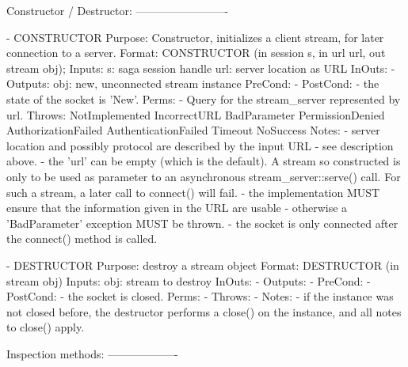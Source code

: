  \begin{myspec}
    Constructor / Destructor:
    -------------------------
 
    - CONSTRUCTOR
      Purpose:  Constructor, initializes a client stream,
                for later connection to a server.
      Format:   CONSTRUCTOR          (in  session    s,
                                      in  url        url,
                                      out stream  obj);
      Inputs:   s:                    saga session handle
                url:                  server location as URL
      InOuts:   -
      Outputs:  obj:                  new, unconnected stream
                                      instance
      PreCond:  -
      PostCond: - the state of the socket is 'New'.
      Perms:    - Query for the stream_server represented by
                  url.
      Throws:   NotImplemented
                IncorrectURL
                BadParameter
                PermissionDenied
                AuthorizationFailed
                AuthenticationFailed
                Timeout
                NoSuccess
      Notes:    - server location and possibly protocol are
                  described by the input URL - see description
                  above.
                - the 'url' can be empty (which is the default).
                  A stream so constructed is only to be used
                  as parameter to an asynchronous
                  stream_server::serve() call.  For such a
                  stream, a later call to connect() will fail.  
                - the implementation MUST ensure that the
                  information given in the URL are usable -
                  otherwise a 'BadParameter' exception MUST be
                  thrown.
                - the socket is only connected after the
                  connect() method is called.
 
 
    - DESTRUCTOR
      Purpose:  destroy a stream object
      Format:   DESTRUCTOR           (in stream obj)
      Inputs:   obj:                  stream to destroy
      InOuts:   -
      Outputs:  -
      PreCond:  -
      PostCond: - the socket is closed.
      Perms:    -
      Throws:   -
      Notes:    - if the instance was not closed before, the 
                  destructor performs a close() on the instance,
                  and all notes to close() apply.
 
 
    Inspection methods:
    -------------------
 

\end{myspec}
